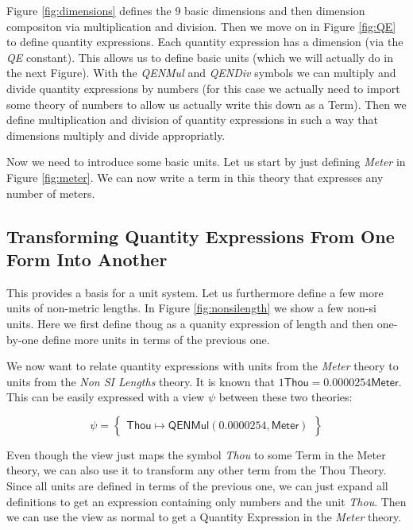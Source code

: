 



Figure \ref{fig:dimensions} defines the 9 basic dimensions and then dimension compositon via multiplication and division. Then we move on in Figure \ref{fig:QE} to define quantity expressions. Each quantity expression has a dimension (via the \textit{QE} constant). This allows us to define basic units (which we will actually do in the next Figure). With the \textit{QENMul} and \textit{QENDiv} symbols we can multiply and divide quantity expressions by numbers (for this case we actually need to import some theory of numbers to allow us actually write this down as a Term). Then we define multiplication and division of quantity expressions in such a way that dimensions multiply and divide appropriatly.

Now we need to introduce some basic units. Let us start by just defining \textit{Meter} in Figure \ref{fig:meter}. We can now write a term in this theory that expresses any number of meters.



\subsection{Transforming Quantity Expressions From One Form Into Another}
\label{sec:qeconv}

This provides a basis for a unit system. Let us furthermore define a few more units of non-metric lengths. In Figure \ref{fig:nonsilength} we show a few non-si units. Here we first define thoug as a quanity expression of length and then one-by-one define more units in terms of the previous one.


We now want to relate quantity expressions with units from the \textit{Meter} theory to units from the \textit{Non SI Lengths} theory. It is known that $1 \mathsf{Thou} = 0.0000254 \mathsf{Meter}$. This can be easily expressed with a view $\psi$ between these two theories:

\[
\psi = \left\{\begin{array}{l}
  \mathsf{Thou} \mapsto \mathsf{QENMul} \left( 0.0000254, \mathsf{Meter} \right)
\end{array}\right\}
\]

Even though the view just maps the symbol \textit{Thou} to some Term in the Meter theory, we can also use it to transform any other term from the Thou Theory. Since all units are defined in terms of the previous one, we can just expand all definitions to get an expression containing only numbers and the unit \textit{Thou}. Then we can use the view as normal to get a Quantity Expression in the \textit{Meter} theory.
